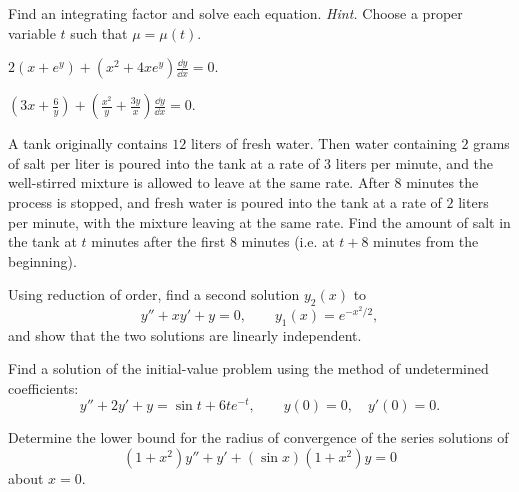 \documentclass[11pt,oneside]{article}
\begin{document}
\begin{problem}
Find an integrating factor and solve each equation. \textit{Hint.} Choose a proper variable $t$ such that $\mu=\mu(t)$.
\begin{problemsubparts}
\item $\displaystyle 2(x+e^y)+(x^2+4xe^y)\frac{\dd y}{\dd x}=0$.
\item $\displaystyle\left(3x+\frac6y\right)+\left(\frac{x^2}{y}+\frac{3y}{x}\right)\frac{\dd y}{\dd x}=0$.
\end{problemsubparts}
\end{problem}

\begin{problem}
A tank originally contains $12$ liters of fresh water. Then water containing $2$ grams of salt per liter is poured into the tank at a rate of $3$ liters per minute, and the well-stirred mixture is allowed to leave at the same rate. After $8$ minutes the process is stopped, and fresh water is poured into the tank at a rate of $2$ liters per minute, with the mixture leaving at the same rate. Find the amount of salt in the tank at $t$ minutes after the first $8$ minutes (i.e. at $t+8$ minutes from the beginning).
\end{problem}

\begin{problem}
Using reduction of order, find a second solution $y_2(x)$ to
\[y''+xy'+y=0,\qquad y_1(x)=e^{-x^2/2},\]
and show that the two solutions are linearly independent.
\end{problem}

\begin{problem}
Find a solution of the initial-value problem using the method of undetermined coefficients:
\[y''+2y'+y=\sin t+6te^{-t},\qquad y(0)=0,\quad y'(0)=0.\]
\end{problem}

\begin{problem}
Determine the lower bound for the radius of convergence of the series solutions of
\[
(1+x^2)y''+y'+(\sin x)(1+x^2)y=0
\]
about $x=0$.
\end{problem}
\end{document}
